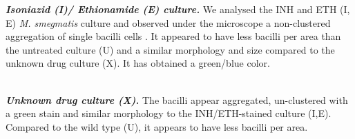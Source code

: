 {{\small \textit{\textbf{Isoniazid (I)/ Ethionamide (E) culture.}}}
We analysed the INH and ETH (I, E) \textit{M. smegmatis} culture and observed under the microscope a non-clustered aggregation of single bacilli cells . It appeared to have less bacilli per area than the untreated culture (U) and a similar morphology and size compared to the unknown drug culture (X). It has obtained a green/blue color.
\noindent   
\begin{minipage}{22em}
   {\footnotesize {}}
\end{minipage}\\[1em]

{\small \textit{\textbf{Unknown drug culture (X).}}}
The bacilli appear aggregated, un-clustered with a green stain and similar morphology to the INH/ETH-stained culture (I,E). Compared to the wild type (U), it appears to have less bacilli per area.
\noindent   
\begin{minipage}{22em}
   {\footnotesize {}}
\end{minipage}\\[1em]

}
\endinput